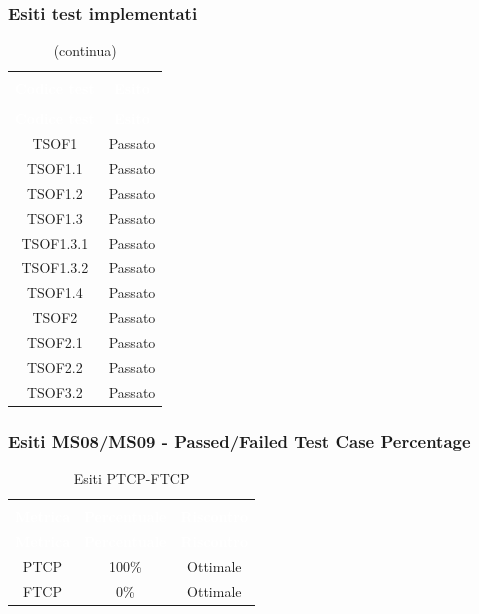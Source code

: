 \subsubsection{Esiti test implementati}
\begin{longtable}{c c}
\rowcolor{white}\caption{Esiti dei test implementati} \\
	\rowcolor{redafk}
\textcolor{white}{\textbf{Codice test}} &
\textcolor{white}{\textbf{Esito}} \\
	\endfirsthead
		\rowcolor{white}\caption[]{(continua)} \\
		\rowcolor{redafk}
\textcolor{white}{\textbf{Codice test}} &
\textcolor{white}{\textbf{Esito}} \\
	\endhead
	TSOF1 & Passato \\
	TSOF1.1 & Passato \\ 
	TSOF1.2 & Passato \\
	TSOF1.3 & Passato \\
	TSOF1.3.1 & Passato \\
	TSOF1.3.2 & Passato \\
	TSOF1.4 & Passato \\
	TSOF2 & Passato \\
	TSOF2.1 & Passato \\
	TSOF2.2 & Passato  \\
	TSOF3.2 & Passato 
	
\end{longtable}

\subsubsection{Esiti MS08/MS09 - Passed/Failed Test Case Percentage}
\begin{longtable}{c c c}
\rowcolor{white}\caption{Esiti PTCP-FTCP} \\
	\rowcolor{redafk}
\textcolor{white}{\textbf{Metrica}} &
\textcolor{white}{\textbf{Percentuale}} & 
\textcolor{white}{\textbf{Riscontro}} \\
	\endfirsthead
\textcolor{white}{\textbf{Metrica}} &
\textcolor{white}{\textbf{Percentuale}} & 
\textcolor{white}{\textbf{Riscontro}} \\
	\endhead
	PTCP & 100\% & Ottimale\\
	FTCP & 0\% & Ottimale\\
\end{longtable}


